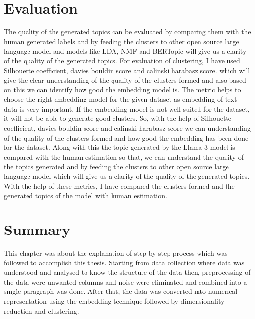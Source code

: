 \section{Evaluation}
 The quality of the generated topics can be evaluated by comparing them with the human generated labels and by feeding the clusters to other open source large language model and models like LDA,
  NMF and BERTopic will give us a clarity of the quality of the generated topics. For evaluation of clustering, I have used Silhouette coefficient, davies bouldin score and calinski harabasz score.
  which will give the clear understanding of the quality of the clusters formed and also based on this we can identify how good the embedding model is. The metric helps to choose the right embedding
  model for the given dataset as embedding of text data is very important. If the embedding model is not well suited for the dataset, it will not be able to generate good clusters. So, with the help of
  Silhouette coefficient, davies bouldin score and calinski harabasz score we can understanding of the quality of the clusters formed  and how good the embedding has been done for the dataset.
  Along with this the topic generated by the Llama 3 model is compared with the human estimation so that, we can understand the quality of the topics generated and by feeding the clusters to other
  open source large language model which will give us a clarity of the quality of the generated topics. With the help of these metrics, I have compared the clusters formed and the generated topics of the model with human estimation.

\section{Summary}

This chapter was about the explanation of step-by-step process which was followed to accomplish this thesis. Starting from data collection where data was understood and analysed to know the structure of the data then,
 preprocessing of the data were unwanted columns and noise were eliminated and combined into a single paragraph was done. After that, the data was converted into numerical representation using the embedding technique 
 followed by dimensionality reduction and clustering.


